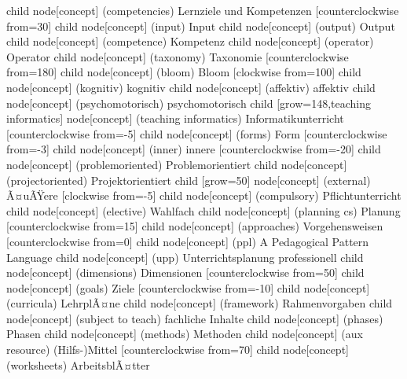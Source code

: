 \documentclass[german,landscape]{article}
\begin{document}
\begin{map}
\begin{scope}[a0 mindmap]
{{{       }
    }
    child { node[concept] (competencies) {Lernziele und Kompetenzen}
       [counterclockwise from=30]
       child  { node[concept] (input)              {Input} }
       child  { node[concept] (output)            {Output} }
       child  { node[concept] (competence)     {Kompetenz} }
       child  { node[concept] (operator)        {Operator} }
       child  { node[concept] (taxonomy)       {Taxonomie}
          [counterclockwise from=180]
          child  { node[concept] (bloom)         {Bloom}
            [clockwise from=100]
            child  { node[concept] (kognitiv)         {kognitiv}         }
            child  { node[concept] (affektiv)         {affektiv}         }
            child  { node[concept] (psychomotorisch)  {psycho\-motorisch}}
         }
       }
    }
  }
  child [grow=148,teaching informatics] { node[concept] (teaching informatics) {Informatik\-unterricht}
     [counterclockwise from=-5]
     child { node[concept] (forms) {Form}
        [counterclockwise from=-3]
        child { node[concept] (inner) {innere}
           [counterclockwise from=-20]
           child { node[concept] (problemoriented) {Problem\-orientiert} }
           child { node[concept] (projectoriented) {Projekt\-orientiert} }
        }   
        child [grow=50] { node[concept] (external) {Ã¤uÃŸere}
           [clockwise from=-5]
           child { node[concept] (compulsory) {Pflicht\-unterricht} }
           child { node[concept] (elective)   {Wahlfach}            }
        }
     }
     child { node[concept] (planning cs) {Planung}
        [counterclockwise from=15]
        child { node[concept] (approaches) {Vorgehens\-weisen}
          [counterclockwise from=0]
          child { node[concept] (ppl) {A Pedagogical Pattern Language}       }
          child { node[concept] (upp) {Unterrichts\-planung pro\-fessionell} }
        }
        child { node[concept] (dimensions) {Dimensionen}
          [counterclockwise from=50]
          child { node[concept] (goals) {Ziele} 
            [counterclockwise from=-10]
            child { node[concept] (curricula)        {Lehr\-plÃ¤ne}         }
            child { node[concept] (framework)        {Rahmen\-vorgaben}    }
            child { node[concept] (subject to teach) {fachliche Inhalte}   }
          }
          child { node[concept] (phases)       {Phasen}         }
          child { node[concept] (methods)      {Methoden}       }
          child { node[concept] (aux resource) {(Hilfs-)Mittel} 
            [counterclockwise from=70]
            child { node[concept] (worksheets) {Arbeits\-blÃ¤tter}                   }
}}}}
\end{scope}
\end{map}
\end{document}
